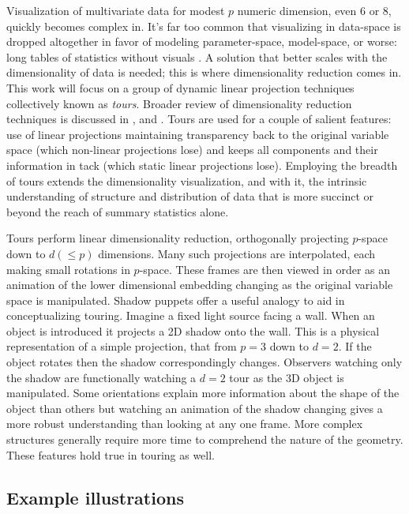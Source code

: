 \documentclass{monashthesis}
\begin{document}
Visualization of multivariate data for modest \(p\) numeric dimension,
even 6 or 8, quickly becomes complex in. It's far too common that
visualizing in data-space is dropped altogether in favor of modeling
parameter-space, model-space, or worse: long tables of statistics
without visuals \autocite{wickham_visualizing_2015}. A solution that
better scales with the dimensionality of data is needed; this is where
dimensionality reduction comes in. This work will focus on a group of
dynamic linear projection techniques collectively known as \emph{tours}.
Broader review of dimensionality reduction techniques is discussed in
\textcite{grinstein_high-dimensional_2002}, and
\textcite{heer_tour_2010}. Tours are used for a couple of salient
features: use of linear projections maintaining transparency back to the
original variable space (which non-linear projections lose) and keeps
all components and their information in tack (which static linear
projections lose). Employing the breadth of tours extends the
dimensionality visualization, and with it, the intrinsic understanding
of structure and distribution of data that is more succinct or beyond
the reach of summary statistics alone.

Tours perform linear dimensionality reduction, orthogonally projecting
\(p\)-space down to \(d(\leq p)\) dimensions. Many such projections are
interpolated, each making small rotations in \(p\)-space. These frames
are then viewed in order as an animation of the lower dimensional
embedding changing as the original variable space is manipulated. Shadow
puppets offer a useful analogy to aid in conceptualizing touring.
Imagine a fixed light source facing a wall. When an object is introduced
it projects a 2D shadow onto the wall. This is a physical representation
of a simple projection, that from \(p=3\) down to \(d=2\). If the object
rotates then the shadow correspondingly changes. Observers watching only
the shadow are functionally watching a \(d=2\) tour as the 3D object is
manipulated. Some orientations explain more information about the shape
of the object than others but watching an animation of the shadow
changing gives a more robust understanding than looking at any one
frame. More complex structures generally require more time to comprehend
the nature of the geometry. These features hold true in touring as well.

\subsection{Example illustrations}\label{example-illustrations}
\end{document}
